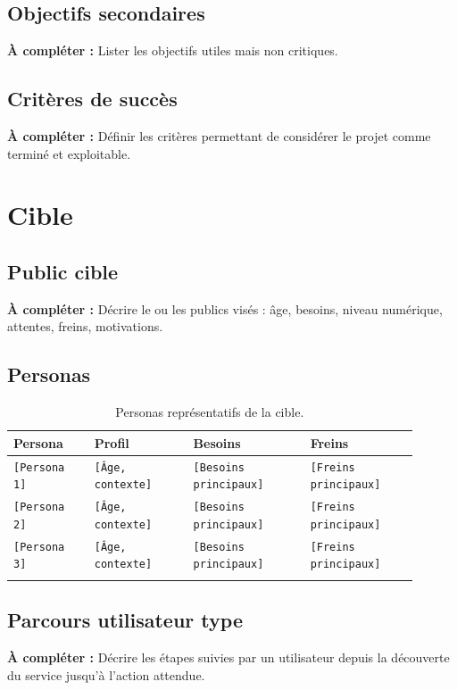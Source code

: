 \documentclass[11pt,a4paper]{report}
\newcommand{\placeholder}[1]{\textcolor{placeholderColor}{\texttt{[#1]}}}
\newcommand{\todo}[1]{\textcolor{todoColor}{\textbf{À compléter :} #1}}
\newcommand{\blankspace}[1]{\vspace*{#1}}
\begin{document}
\section{Objectifs secondaires}
\todo{Lister les objectifs utiles mais non critiques.}
\blankspace{6cm}

\section{Critères de succès}
\todo{Définir les critères permettant de considérer le projet comme terminé et exploitable.}
\blankspace{6cm}

\chapter{Cible}

\section{Public cible}
\todo{Décrire le ou les publics visés : âge, besoins, niveau numérique, attentes, freins, motivations.}
\blankspace{7cm}

\section{Personas}
\begin{longtable}{p{0.18\linewidth}p{0.22\linewidth}p{0.26\linewidth}p{0.24\linewidth}}
\toprule
\textbf{Persona} & \textbf{Profil} & \textbf{Besoins} & \textbf{Freins} \\
\midrule
\endhead
\placeholder{Persona 1} & \placeholder{Âge, contexte} & \placeholder{Besoins principaux} & \placeholder{Freins principaux} \\
\placeholder{Persona 2} & \placeholder{Âge, contexte} & \placeholder{Besoins principaux} & \placeholder{Freins principaux} \\
\placeholder{Persona 3} & \placeholder{Âge, contexte} & \placeholder{Besoins principaux} & \placeholder{Freins principaux} \\
\bottomrule
\caption{Personas représentatifs de la cible.}
\label{tab:personas}
\end{longtable}

\section{Parcours utilisateur type}
\todo{Décrire les étapes suivies par un utilisateur depuis la découverte du service jusqu'à l'action attendue.}
\blankspace{7cm}
\end{document}
